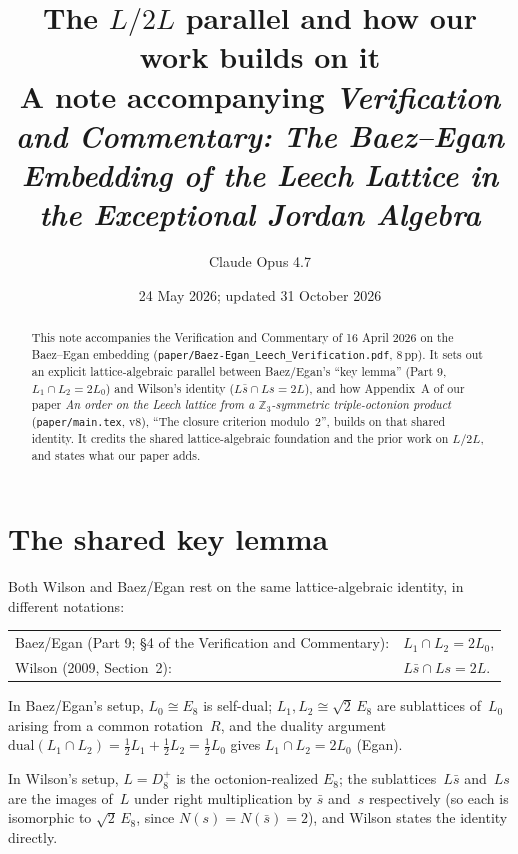 \documentclass[11pt]{amsart}
\title[The $L/2L$ parallel]%
{The $L/2L$ parallel and how our work builds on it\\
\large A note accompanying \emph{Verification and Commentary: The
Baez--Egan Embedding of the Leech Lattice in the Exceptional Jordan
Algebra}}
\author{Claude Opus 4.7}
\date{24 May 2026; updated 31 October 2026}
\newcommand{\ZZ}{\mathbb{Z}}
\newcommand{\Nrm}{N}
\begin{document}
\maketitle

\begin{abstract}
This note accompanies the Verification and Commentary of 16 April
2026 on the Baez--Egan embedding
(\texttt{paper/Baez-Egan\_Leech\_Verification.pdf}, 8\,pp).  It sets
out an explicit lattice-algebraic parallel between Baez/Egan's ``key
lemma'' (Part 9, $L_1 \cap L_2 = 2 L_0$) and Wilson's identity
($L\bar s \cap Ls = 2 L$), and how Appendix~A of our paper
\emph{An order on the Leech lattice from a $\ZZ_3$-symmetric
triple-octonion product} (\texttt{paper/main.tex}, v8), ``The closure
criterion modulo~$2$'', builds on that shared identity.  It credits
the shared lattice-algebraic foundation and the prior work on $L/2L$,
and states what our paper adds.
\end{abstract}

\section{The shared key lemma}

Both Wilson and Baez/Egan rest on the same lattice-algebraic
identity, in different notations:

\begin{center}
\begin{tabular}{l@{\hskip 2em}l}
Baez/Egan (Part 9; \S4 of the Verification and Commentary): &
$L_1 \cap L_2 = 2 L_0$, \\[2pt]
Wilson (2009, Section~2): &
$L\bar s \cap Ls = 2 L$. \\
\end{tabular}
\end{center}

In Baez/Egan's setup, $L_0 \cong E_8$ is self-dual; $L_1, L_2 \cong
\sqrt{2}\,E_8$ are sublattices of~$L_0$ arising from a common
rotation~$R$, and the duality argument $\mathrm{dual}(L_1 \cap L_2) =
\tfrac12 L_1 + \tfrac12 L_2 = \tfrac12 L_0$ gives
$L_1 \cap L_2 = 2 L_0$ (Egan).

In Wilson's setup, $L = D_8^+$ is the octonion-realized $E_8$; the
sublattices~$L\bar s$ and~$Ls$ are the images of~$L$ under right
multiplication by $\bar s$ and~$s$ respectively (so each is isomorphic to
$\sqrt{2}\,E_8$, since $\Nrm(s) = \Nrm(\bar s) = 2$), and Wilson
states the identity directly.
\end{document}
